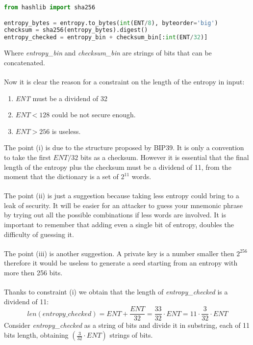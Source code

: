 \begin{lstlisting}[language=Python]
from hashlib import sha256

entropy_bytes = entropy.to_bytes(int(ENT/8), byteorder='big')
checksum = sha256(entropy_bytes).digest()
entropy_checked = entropy_bin + checksum_bin[:int(ENT/32)]
\end{lstlisting}
Where \textit{entropy\_bin} and \textit{checksum\_bin} are strings of bits that can be concatenated.
\\ \\
Now it is clear the reason for a constraint on the length of the entropy in input: 
\begin{enumerate}[label=\roman*]
	\item \textit{ENT} must be a dividend of 32
	\item $ENT<128$ could be not secure enough.
	\item $ENT>256$ is useless.
\end{enumerate}
The point (i) is due to the structure proposed by BIP39. It is only a convention to take the first $ENT/32$ bits as a checksum. However it is essential that the final length of the entropy plus the checksum must be a dividend of 11, from the moment that the dictionary is a set of $2^{11}$ words.
\\ \\
The point (ii) is just a suggestion because taking less entropy could bring to a leak of security. It will be easier for an attacker to guess your mnemonic phrase by trying out all the possible combinations if less words are involved. It is important to remember that adding even a single bit of entropy, doubles the difficulty of guessing it.
\\ \\
The point (iii) is another suggestion. A private key is a number smaller then $2^{256}$ therefore it would be useless to generate a seed starting from an entropy with more then 256 bits.
\\ \\
Thanks to constraint (i) we obtain that the length of \textit{entropy\_checked} is a dividend of 11:
\begin{equation*}
len(entropy\_checked)=ENT+\dfrac{ENT}{32}=\dfrac{33}{32}\cdot ENT=11\cdot \dfrac{3}{32}\cdot ENT
\end{equation*}
Consider \textit{entropy\_checked} as a string of bits and divide it in substring, each of 11 bits length, obtaining $(\frac{3}{32}\cdot ENT)$ strings of bits.
\\ \\
